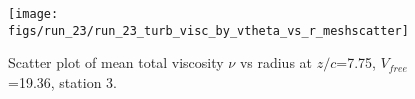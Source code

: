 \begin{figure}[H]
\centering
\texttt{[image: figs/run\_23/run\_23\_turb\_visc\_by\_vtheta\_vs\_r\_meshscatter]}
\caption{Scatter plot of mean total viscosity $\nu$ vs radius at $z/c$=7.75, $V_{free}$=19.36, station 3.}
\label{fig:run_23_turb_visc_by_vtheta_vs_r_meshscatter}
\end{figure}



